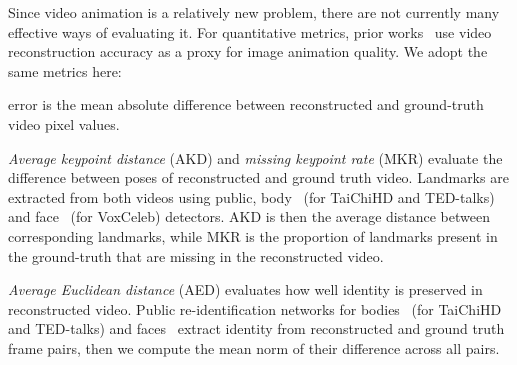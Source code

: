 \documentclass[final]{cvpr}
\begin{document}
Since video animation is a relatively new problem, there are not currently many effective ways of evaluating it. For quantitative metrics, prior works~\cite{wiles2018x2face,siarohin2018animating,fomm} use video reconstruction accuracy as a proxy for image animation quality. We adopt the same metrics here:
\begin{itemize*}
    \item  error is the mean absolute difference between reconstructed and ground-truth video pixel values. 
    \item \emph{Average keypoint distance} (AKD) and \emph{missing keypoint rate} (MKR) evaluate the difference between poses of reconstructed and ground truth video. Landmarks are extracted from both videos using public, body~\cite{cao2017realtime} (for TaiChiHD and TED-talks) and face~\cite{Bulat_2017_ICCV} (for VoxCeleb) detectors. AKD is then the average distance between corresponding landmarks, while MKR is the proportion of landmarks present in the ground-truth that are missing in the reconstructed video.
    \item \emph{Average Euclidean distance} (AED) evaluates how well identity is preserved in reconstructed video. Public re-identification networks for bodies~\cite{hermans2017defense} (for TaiChiHD and TED-talks) and faces~\cite{amos2016openface} extract identity from reconstructed and ground truth frame pairs, then we compute the mean  norm of their difference across all pairs.
\end{itemize*}
\end{document}
